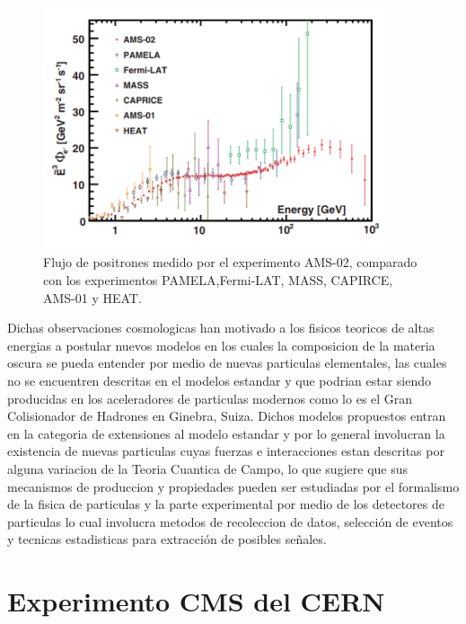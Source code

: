 \begin{figure}
\begin{center}
 \includegraphics[width=4.0in]{AMS_positronflux.png}
  \caption{Flujo de positrones medido por el experimento AMS-02, comparado con los experimentos PAMELA,Fermi-LAT, MASS, CAPIRCE, AMS-01 y HEAT.}
 \label{fig:AMS_positron}
 \end{center}
\end{figure}

Dichas observaciones cosmologicas han motivado a los fisicos teoricos de altas energias a postular nuevos modelos en los cuales la composicion de la materia oscura se pueda entender por medio de nuevas particulas elementales, las cuales no se encuentren descritas en el modelos estandar y que podrian estar siendo producidas en los aceleradores de particulas modernos como lo es el Gran Colisionador de Hadrones en Ginebra, Suiza.  Dichos modelos propuestos entran en la categoria de extensiones al modelo estandar y por lo general involucran la existencia de nuevas particulas cuyas fuerzas e interacciones estan descritas por alguna variacion de la Teoria Cuantica de Campo, lo que sugiere que sus mecanismos de produccion y propiedades pueden ser estudiadas por el formalismo de la fisica de particulas y la parte experimental por medio de los detectores de particulas lo cual involucra metodos de recoleccion de datos, selecci\'on de eventos y tecnicas estadisticas para extracci\'on de posibles se\~nales.

\section{Experimento CMS del CERN}

